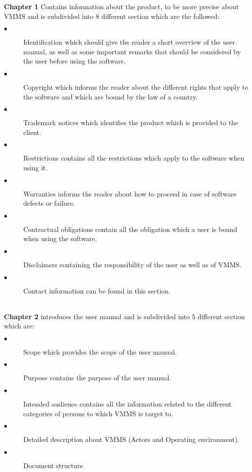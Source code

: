\textbf{Chapter 1} Contains information about the product, to be more precise
about VMMS and is subdivided into 8 different section which are the followed:

\begin{description}
\item[$\bullet$] Identification which should give the reader a short overview
of the user manual, as well as some important remarks that should be considered
by the user before using the software.
\item[$\bullet$] Copyright which informs the reader about the different rights
that apply  to the software and which are bound by the law of a country.
\item[$\bullet$] Trademark notices which identifies the product which is
provided  to the client.
\item[$\bullet$] Restrictions contains all the restrictions which apply to the
software when using it.
\item[$\bullet$] Warranties informs the reader about how to proceed in case of
software defects or failure.
\item[$\bullet$] Contractual obligations contain all the obligation which a
user is bound when using the software.
\item[$\bullet$] Disclaimers containing the responsibility of the user as well
as of VMMS.
\item[$\bullet$] Contact information can be found in this section.\\\\
\end{description}

\textbf{Chapter 2} introduces the user manual and is subdivided into 5 different
section which are:


\begin{description}
\item[$\bullet$] Scope which provides the scope of the user manual.
\item[$\bullet$] Purpose contains the purpose of the user manual.
\item[$\bullet$] Intended audience contains all the information related to the 
different categories of persons to which VMMS is target to.
\item[$\bullet$] Detailed description about VMMS (Actors and Operating
environment).
\item[$\bullet$] Document structure\\\\
\end{description}


